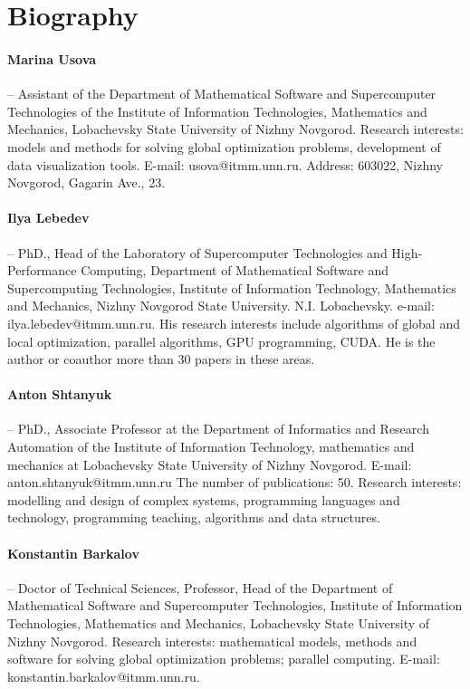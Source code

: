\documentclass[a4paper,12pt,russian]{article}
\begin{document}
\section*{Biography}

\paragraph{Marina Usova} -- Assistant of the Department of Mathematical Software and Supercomputer Technologies of the Institute of Information Technologies, Mathematics and Mechanics, Lobachevsky State University of Nizhny Novgorod. Research interests: models and methods for solving global optimization problems, development of data visualization tools. E-mail: usova@itmm.unn.ru. Address: 603022, Nizhny Novgorod, Gagarin Ave., 23.
\paragraph{Ilya Lebedev} -- PhD., Head of the Laboratory of Supercomputer Technologies and High-Performance Computing, Department of Mathematical Software and Supercomputing Technologies, Institute of Information Technology, Mathematics and Mechanics, Nizhny Novgorod State University. N.I. Lobachevsky. e-mail: ilya.lebedev@itmm.unn.ru. His research interests include algorithms of global and local optimization, parallel algorithms, GPU programming, CUDA. He is the author or coauthor more than 30 papers in these areas.
\paragraph{Anton Shtanyuk} -- PhD., Associate Professor at the Department of Informatics and Research Automation of the Institute of Information Technology, mathematics and mechanics at Lobachevsky State University of Nizhny Novgorod. E-mail: anton.shtanyuk@itmm.unn.ru The number of publications: 50. Research interests: modelling and design of complex systems, programming languages and technology, programming teaching, algorithms and data structures.
\paragraph{Konstantin Barkalov} -- Doctor of Technical Sciences, Professor, Head of the Department of Mathematical Software and Supercomputer Technologies, Institute of Information Technologies, Mathematics and Mechanics, Lobachevsky State University of Nizhny Novgorod. Research interests: mathematical models, methods and software for solving global optimization problems; parallel computing. E-mail: konstantin.barkalov@itmm.unn.ru.
\end{document}
